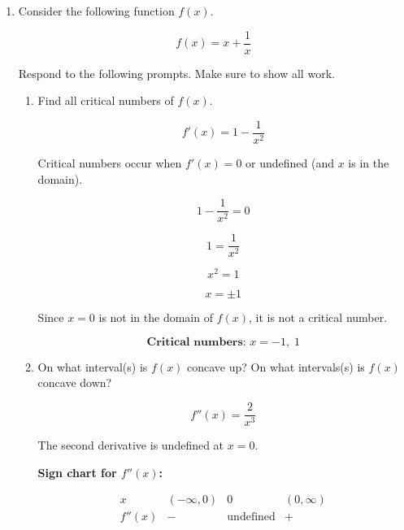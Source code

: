 \documentclass[11pt]{article}
\begin{document}
\begin{enumerate}


\newpage


\item Consider the following function $f(x)$.

\[f(x)=x + \frac{1}{x}\]

Respond to the following prompts. Make sure to show all work.

\begin{enumerate}
    \item Find all critical numbers of $f(x)$.

    {\color{blue}
    \[
    f'(x)=1-\frac{1}{x^2}
    \]

    Critical numbers occur when $f'(x)=0$ or undefined (and $x$ is in the domain).

    \[
    1-\frac{1}{x^2}=0
    \]

    \[
    1=\frac{1}{x^2}
    \]

    \[
    x^2=1
    \]

    \[
    x=\pm1
    \]

    Since $x=0$ is not in the domain of $f(x)$, it is not a critical number.

    \[
    \textbf{Critical numbers: } x=-1,\;1
    \]
    }

    \item On what interval(s) is $f(x)$ concave up? On what intervals(s) is $f(x)$ concave down?

 {\color{blue}

    \[
    f''(x)=\frac{2}{x^3}
    \]

    The second derivative is undefined at $x=0$.

    \vspace{0.3cm}

    \textbf{Sign chart for $f''(x)$:}

    \[
    \begin{array}{c|ccc}
    x & (-\infty,0) & 0 & (0,\infty)\\
    \hline
    f''(x) & - & \text{undefined} & +
    \end{array}
    \]

}
\end{enumerate}
\end{enumerate}
\end{document}
